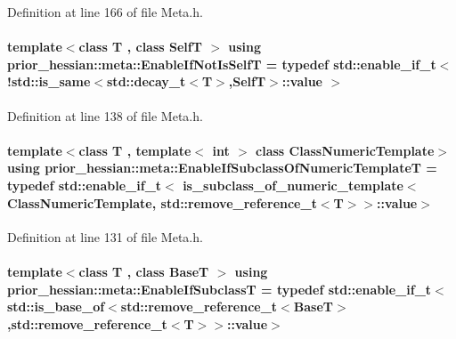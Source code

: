 Definition at line 166 of file Meta.\+h.

\paragraph[{\texorpdfstring{Enable\+If\+Not\+Is\+SelfT}{EnableIfNotIsSelfT}}]{\setlength{\rightskip}{0pt plus 5cm}template$<$class T , class SelfT $>$ using {\bf prior\+\_\+hessian\+::meta\+::\+Enable\+If\+Not\+Is\+SelfT} = typedef std\+::enable\+\_\+if\+\_\+t$<$ !std\+::is\+\_\+same$<$std\+::decay\+\_\+t$<$T$>$,SelfT$>$\+::value $>$}\hypertarget{namespaceprior__hessian_1_1meta_ad84d45d1d36f0fbf216f1380d638d22a}{}\label{namespaceprior__hessian_1_1meta_ad84d45d1d36f0fbf216f1380d638d22a}


Definition at line 138 of file Meta.\+h.

\paragraph[{\texorpdfstring{Enable\+If\+Subclass\+Of\+Numeric\+TemplateT}{EnableIfSubclassOfNumericTemplateT}}]{\setlength{\rightskip}{0pt plus 5cm}template$<$class T , template$<$ int $>$ class Class\+Numeric\+Template$>$ using {\bf prior\+\_\+hessian\+::meta\+::\+Enable\+If\+Subclass\+Of\+Numeric\+TemplateT} = typedef std\+::enable\+\_\+if\+\_\+t$<$ {\bf is\+\_\+subclass\+\_\+of\+\_\+numeric\+\_\+template}$<$Class\+Numeric\+Template, std\+::remove\+\_\+reference\+\_\+t$<$T$>$$>$\+::value$>$}\hypertarget{namespaceprior__hessian_1_1meta_a722a7d9905845f2dd08a95b2ddecc10e}{}\label{namespaceprior__hessian_1_1meta_a722a7d9905845f2dd08a95b2ddecc10e}


Definition at line 131 of file Meta.\+h.

\paragraph[{\texorpdfstring{Enable\+If\+SubclassT}{EnableIfSubclassT}}]{\setlength{\rightskip}{0pt plus 5cm}template$<$class T , class BaseT $>$ using {\bf prior\+\_\+hessian\+::meta\+::\+Enable\+If\+SubclassT} = typedef std\+::enable\+\_\+if\+\_\+t$<$ std\+::is\+\_\+base\+\_\+of$<$std\+::remove\+\_\+reference\+\_\+t$<$BaseT$>$,std\+::remove\+\_\+reference\+\_\+t$<$T$>$$>$\+::value$>$}\hypertarget{namespaceprior__hessian_1_1meta_abc650c6661b53cac162bce78cc6c4830}{}\label{namespaceprior__hessian_1_1meta_abc650c6661b53cac162bce78cc6c4830}


